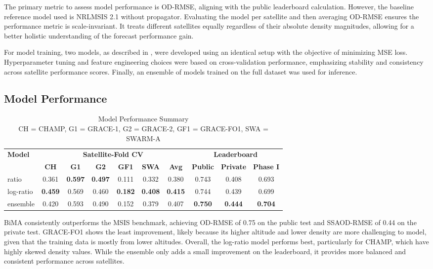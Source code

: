 \documentclass[11pt,a4paper]{storm-ai_report}
\begin{document}
The primary metric to assess model performance is OD-RMSE, aligning with the public leaderboard calculation. However, the baseline reference model used is NRLMSIS 2.1 without propagator. Evaluating the model per satellite and then averaging OD-RMSE ensures the performance metric is scale-invariant. It treats different satellites equally regardless of their absolute density magnitudes, allowing for a better holistic understanding of the forecast performance gain.

For model training, two models, as described in , were developed using an identical setup with the objective of minimizing MSE loss. Hyperparameter tuning and feature engineering choices were based on cross-validation performance, emphasizing stability and consistency across satellite performance scores. Finally, an ensemble of models trained on the full dataset was used for inference.

\subsection{Model Performance}

\begin{table}[h]
\centering
\captionsetup{width=0.7\textwidth}
\caption{\centering Model Performance Summary\\CH = CHAMP, G1 = GRACE-1, G2 = GRACE-2, GF1 = GRACE-FO1, SWA = SWARM-A}
\begin{tabular}{|l|ccccc|c|cc|c|}
\hline
\textbf{Model} & \multicolumn{6}{c|}{\textbf{Satellite-Fold CV}} & \multicolumn{3}{c|}{\textbf{Leaderboard}} \\
\cline{2-7} \cline{8-10}
               & \textbf{CH} & \textbf{G1} & \textbf{G2} & \textbf{GF1} & \textbf{SWA} & \textbf{Avg} & \textbf{Public} & \textbf{Private} & \textbf{Phase I} \\
\hline
ratio      & 0.361 & \textbf{0.597} & \textbf{0.497} & 0.111 & 0.332 & 0.380 & 0.743 & 0.408 & 0.693 \\
log-ratio  & \textbf{0.459} & 0.569 & 0.460 & \textbf{0.182} & \textbf{0.408} & \textbf{0.415} & 0.744 & 0.439 & 0.699 \\
ensemble   & 0.420 & {0.593} & {0.490} & 0.152 & 0.379 & 0.407 & \textbf{0.750} & \textbf{0.444} & \textbf{0.704} \\
\hline
\end{tabular}
\label{tab:model_performance}
\end{table}

BiMA consistently outperforms the MSIS benchmark, achieving OD-RMSE of 0.75 on the public test and SSAOD-RMSE of 0.44 on the private test. GRACE-FO1 shows the least improvement, likely because its higher altitude and lower density are more challenging to model, given that the training data is mostly from lower altitudes. Overall, the log-ratio model performs best, particularly for CHAMP, which have highly skewed density values. While the ensemble only adds a small improvement on the leaderboard, it provides more balanced and consistent performance across satellites.
\end{document}
